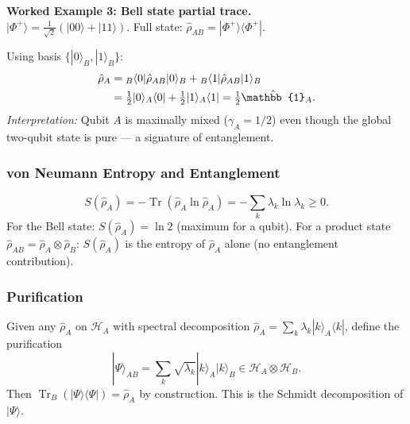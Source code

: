 \documentclass[11pt,a4paper]{article}
\begin{document}
\begin{tcolorbox}[goldbox]
\textbf{Worked Example 3: Bell state partial trace.}\\
$|\Phi^+\rangle=\tfrac{1}{\sqrt{2}}(|00\rangle+|11\rangle)$.
Full state: $\hat{\rho}_{AB}=|\Phi^+\rangle\langle\Phi^+|$.

Using basis $\{|0\rangle_B,|1\rangle_B\}$:
\begin{align}
\hat{\rho}_A
&={}_B\langle 0|\hat{\rho}_{AB}|0\rangle_B+{}_B\langle 1|\hat{\rho}_{AB}|1\rangle_B\notag\\
&=\tfrac{1}{2}|0\rangle_A\langle 0|+\tfrac{1}{2}|1\rangle_A\langle 1|
 =\tfrac{1}{2}\hat{\mathbb{1}}_A.
\label{eq:L01.6}
\end{align}
\textit{Interpretation:} Qubit $A$ is maximally mixed ($\gamma_A=1/2$) even though
the global two-qubit state is pure --- a signature of entanglement.
\end{tcolorbox}

\subsubsection*{von Neumann Entropy and Entanglement}

 

\begin{equation}
S(\hat{\rho}_A)=-\operatorname{Tr}(\hat{\rho}_A\ln\hat{\rho}_A)
=-\sum_k\lambda_k\ln\lambda_k\ge 0.
\label{eq:L01.7}
\end{equation}
For the Bell state: $S(\hat{\rho}_A)=\ln 2$ (maximum for a qubit).
For a product state $\hat{\rho}_{AB}=\hat{\rho}_A\otimes\hat{\rho}_B$:
$S(\hat{\rho}_A)$ is the entropy of $\hat{\rho}_A$ alone (no entanglement contribution).

\subsubsection*{Purification}

\medskip\noindent
Given any $\hat{\rho}_A$ on $\mathcal{H}_A$ with spectral decomposition
$\hat{\rho}_A=\sum_k\lambda_k|k\rangle_A\langle k|$, define the purification
\begin{equation}
|\Psi\rangle_{AB}=\sum_k\sqrt{\lambda_k}|k\rangle_A|k\rangle_B\in\mathcal{H}_A\otimes\mathcal{H}_B.
\label{eq:L01.8}
\end{equation}
Then $\operatorname{Tr}_B(|\Psi\rangle\langle\Psi|)=\hat{\rho}_A$ by construction.
This is the Schmidt decomposition of $|\Psi\rangle$.
\end{document}
